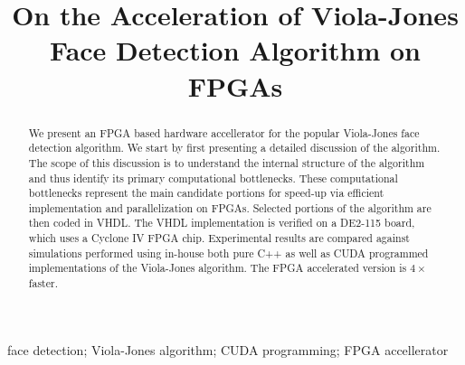 \documentclass[conference]{IEEEtran}
\begin{document}
\title {On the Acceleration of Viola-Jones Face Detection Algorithm on FPGAs}

\author
{
}

	      
\maketitle


\begin {abstract}


We present an FPGA based hardware accellerator for the popular Viola-Jones face detection algorithm.
We start by first presenting a detailed discussion of the algorithm. The scope of this discussion is to understand the internal structure of the algorithm and thus identify its primary computational bottlenecks. These computational bottlenecks represent the main candidate portions for speed-up via efficient implementation and parallelization on FPGAs. 
Selected portions of the algorithm are then coded in VHDL. The VHDL implementation is verified on a DE2-115 board, which uses a Cyclone IV FPGA chip.
Experimental results are compared against simulations performed using in-house both pure C++ as well as CUDA programmed implementations of the Viola-Jones algorithm.
The FPGA accelerated version is $4\times$ faster.


\end {abstract}

\begin{IEEEkeywords}
face detection; Viola-Jones algorithm; CUDA programming; FPGA accellerator

\end{IEEEkeywords}
\end{document}
